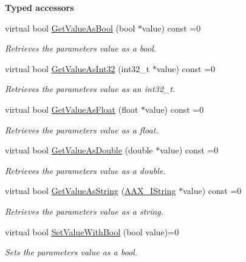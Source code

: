 \begin{Indent}\textbf{ Typed accessors}\par
\begin{DoxyCompactItemize}
\item 
virtual bool \mbox{\hyperlink{a01857_a9d86d7e89489e7f7ccbacaa55eb98f72}{Get\+Value\+As\+Bool}} (bool $\ast$value) const =0
\begin{DoxyCompactList}\small\item\em Retrieves the parameter\textquotesingle{}s value as a bool. \end{DoxyCompactList}\item 
virtual bool \mbox{\hyperlink{a01857_a2a7d538cbb30de98c5d55acdddbec05f}{Get\+Value\+As\+Int32}} (int32\+\_\+t $\ast$value) const =0
\begin{DoxyCompactList}\small\item\em Retrieves the parameter\textquotesingle{}s value as an int32\+\_\+t. \end{DoxyCompactList}\item 
virtual bool \mbox{\hyperlink{a01857_a8054cde098e28f91f9d3abf6341cf523}{Get\+Value\+As\+Float}} (float $\ast$value) const =0
\begin{DoxyCompactList}\small\item\em Retrieves the parameter\textquotesingle{}s value as a float. \end{DoxyCompactList}\item 
virtual bool \mbox{\hyperlink{a01857_ad9ab3c9e0ee521e445f44b77ae5d9d06}{Get\+Value\+As\+Double}} (double $\ast$value) const =0
\begin{DoxyCompactList}\small\item\em Retrieves the parameter\textquotesingle{}s value as a double. \end{DoxyCompactList}\item 
virtual bool \mbox{\hyperlink{a01857_ab0d640c37120decbbe48f0c1483770f9}{Get\+Value\+As\+String}} (\mbox{\hyperlink{a01873}{A\+A\+X\+\_\+\+I\+String}} $\ast$value) const =0
\begin{DoxyCompactList}\small\item\em Retrieves the parameter\textquotesingle{}s value as a string. \end{DoxyCompactList}\item 
virtual bool \mbox{\hyperlink{a01857_ae925146da822a568029ff295006152e2}{Set\+Value\+With\+Bool}} (bool value)=0
\begin{DoxyCompactList}\small\item\em Sets the parameter\textquotesingle{}s value as a bool. \end{DoxyCompactList}\item 

\end{DoxyCompactItemize}
\end{Indent}
